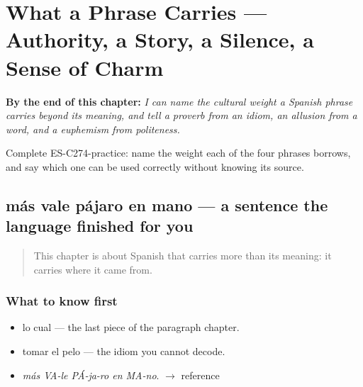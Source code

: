 
\chapter{What a Phrase Carries --- Authority, a Story, a Silence, a Sense of Charm}
\label{ch:peso-cultural}

\begin{chapteropening}
\textbf{By the end of this chapter:} \emph{I can name the cultural weight a Spanish phrase carries beyond its meaning, and tell a proverb from an idiom, an allusion from a word, and a euphemism from politeness.}

Complete ES-C274-practice: name the weight each of the four phrases borrows, and say which one can be used correctly without knowing its source.
\end{chapteropening}

\section[más vale pájaro en mano]{más vale pájaro en mano — a sentence the language finished for you}

\label{lesson:ES-C274-mas-vale-pajaro}



\begin{quote}
This chapter is about Spanish that carries more than its meaning: it carries where it came from.
\end{quote}

\subsection*{What to know first}
\begin{itemize}
\raggedright
  \item lo cual — the last piece of the paragraph chapter.
  \item tomar el pelo — the idiom you cannot decode.
\end{itemize}

\begin{sounds}
\begin{itemize}
\raggedright
  \item \emph{más VA-le PÁ-ja-ro en MA-no}. $\to$ reference
\end{itemize}
\end{sounds}


